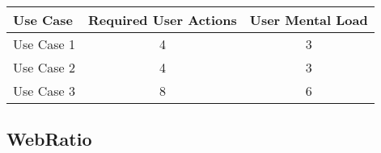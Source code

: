 


\begin{tabularx}{\textwidth}{Xcc}
\textbf{Use Case} & \textbf{Required User Actions} & \textbf{User Mental Load}\\
\hline
Use Case 1                          & 4 & 3 \\
Use Case 2                          & 4 & 3 \\
Use Case 3                          & 8 & 6
\end{tabularx}

\subsection*{WebRatio}




